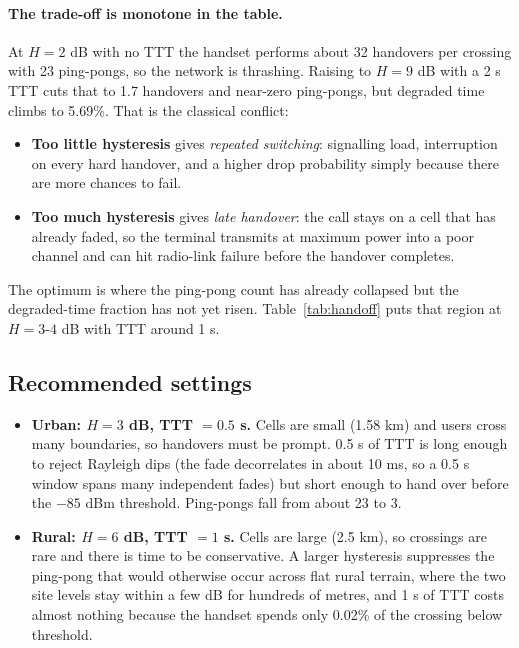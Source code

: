 \documentclass[9pt,a4paper]{article}
\begin{document}
\paragraph{The trade-off is monotone in the table.} At $H=2$ dB with no TTT the handset performs about
32 handovers per crossing with 23 ping-pongs, so the network is thrashing. Raising to $H=9$ dB with
a 2 s TTT cuts that to 1.7 handovers and near-zero ping-pongs, but degraded time climbs to
5.69\%. That is the classical conflict:

\begin{itemize}[leftmargin=1.4em,itemsep=1pt,topsep=2pt]
\item \textbf{Too little hysteresis} gives \emph{repeated switching}: signalling load,
interruption on every hard handover, and a higher drop probability simply because there are more
chances to fail.
\item \textbf{Too much hysteresis} gives \emph{late handover}: the call stays on a cell that has
already faded, so the terminal transmits at maximum power into a poor channel and can hit
radio-link failure before the handover completes.
\end{itemize}

The optimum is where the ping-pong count has already collapsed but the degraded-time fraction has
not yet risen. Table~\ref{tab:handoff} puts that region at $H=3$-$4$ dB with TTT around 1 s.

\subsection{Recommended settings}
\begin{itemize}[leftmargin=1.4em,itemsep=1pt,topsep=2pt]
\item \textbf{Urban: $H=3$ dB, TTT $=0.5$ s.} Cells are small (1.58 km) and users cross many
boundaries, so handovers must be prompt. 0.5 s of TTT is long enough to reject Rayleigh dips (the
fade decorrelates in about 10 ms, so a 0.5 s window spans many independent fades) but short enough
to hand over before the $-85$ dBm threshold. Ping-pongs fall from about 23 to 3.
\item \textbf{Rural: $H=6$ dB, TTT $=1$ s.} Cells are large (2.5 km), so crossings are rare and
there is time to be conservative. A larger hysteresis suppresses the ping-pong that would
otherwise occur across flat rural terrain, where the two site levels stay within a few dB for
hundreds of metres, and 1 s of TTT costs almost nothing because the handset spends only 0.02\% of
the crossing below threshold.
\end{itemize}
\end{document}
